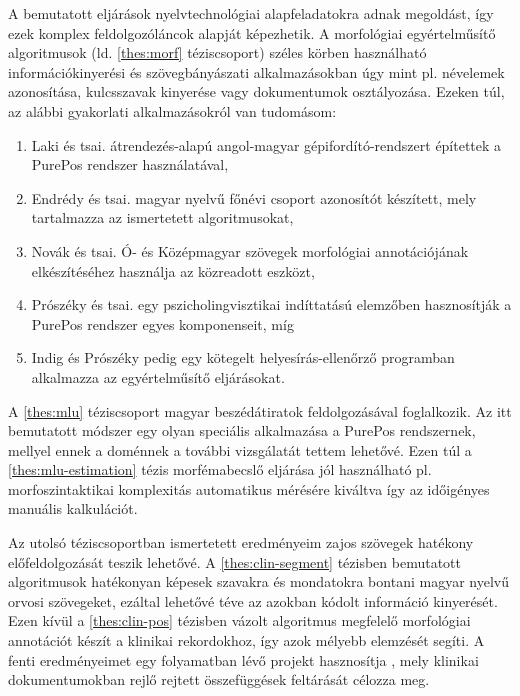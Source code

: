 A bemutatott eljárások nyelvtechnológiai alapfeladatokra adnak megoldást, így ezek komplex feldolgozóláncok alapját képezhetik.
A morfológiai egyértelműsítő algoritmusok (ld. \ref{thes:morf} téziscsoport) széles körben használható információkinyerési és szövegbányászati alkalmazásokban úgy mint pl. névelemek azonosítása, kulcsszavak kinyerése vagy dokumentumok osztályozása.
Ezeken túl, az alábbi gyakorlati alkalmazásokról van tudomásom:
\begin{enumerate} %
\item Laki és tsai. átrendezés-alapú angol-magyar gépifordító-rendszert \cite{Laki2013} építettek a PurePos rendszer használatával,
\item Endrédy és tsai. \cite{Endredy2014} magyar nyelvű főnévi csoport azonosítót készített, mely tartalmazza az ismertetett algoritmusokat,
\item Novák és tsai. Ó- és Középmagyar szövegek morfológiai annotációjának elkészítéséhez használja \cite{Novak2013} az közreadott eszközt,
\item Prószéky és tsai. egy pszicholingvisztikai indíttatású elemzőben hasznosítják \cite{Proszeky2014} a PurePos rendszer egyes komponenseit, míg
\item Indig és Prószéky \cite{Indig2013} pedig egy kötegelt helyesírás-ellenőrző programban alkalmazza az egyértelműsítő eljárásokat.
\end{enumerate}

A \ref{thes:mlu} téziscsoport magyar beszédátiratok feldolgozásával foglalkozik. 
Az itt bemutatott módszer egy olyan speciális alkalmazása a PurePos rendszernek, mellyel ennek a doménnek a további vizsgálatát tettem lehetővé.
Ezen túl a \ref{thes:mlu-estimation} tézis morfémabecslő eljárása jól használható pl. morfoszintaktikai komplexitás automatikus mérésére kiváltva így az időigényes manuális kalkulációt.

Az utolsó téziscsoportban ismertetett eredményeim zajos szövegek hatékony előfeldolgozását teszik lehetővé.
A \ref{thes:clin-segment} tézisben bemutatott algoritmusok hatékonyan képesek szavakra és mondatokra bontani magyar nyelvű orvosi szövegeket, ezáltal lehetővé téve az azokban kódolt információ kinyerését. 
Ezen kívül a \ref{thes:clin-pos} tézisben vázolt algoritmus megfelelő morfológiai annotációt készít a klinikai rekordokhoz, így azok mélyebb elemzését segíti.
A fenti eredményeimet egy folyamatban lévő projekt hasznosítja \cite{Siklosi2014,Siklosi2014mszny}, mely klinikai dokumentumokban rejlő rejtett összefüggések feltárását célozza  meg.


